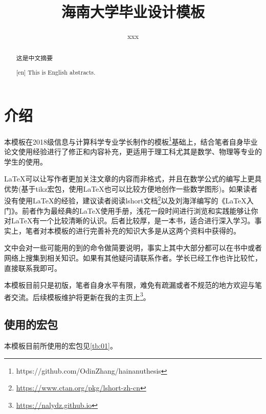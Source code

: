 \documentclass{hainanuthesis}
\title{海南大学毕业设计模板}
\author{xxx}
\theoremstyle{definition}
\begin{document}
	\makecover
	\begin{abstract}
		这是中文摘要
	\end{abstract}

	\thispagestyle{empty}
	
	\newpage
	\begin{abstract}[en]
		This is English abstracts.
	\end{abstract}
	\thispagestyle{empty}
	
	\newpage
	\tableofcontents
	\thispagestyle{empty}
	
	\newpage
	\setcounter{page}{1}
	\section{介绍}
	
	本模板在2018级信息与计算科学专业学长制作的模板\footnote{https://github.com/OdinZhang/hainanuthesis}基础上，结合笔者自身毕业论文使用经验进行了修正和内容补充，更适用于理工科尤其是数学、物理等专业的学生的使用。
	
	\LaTeX 可以让写作者更加关注文章的内容而非格式，并且在数学公式的编写上更具优势(基于tikz宏包，使用\LaTeX 也可以比较方便地创作一些数学图形)。如果读者没有使用\LaTeX 的经验，建议读者阅读lshort文档\footnote{\href{https://www.ctan.org/pkg/lshort-zh-cn}{https://www.ctan.org/pkg/lshort-zh-cn}}以及刘海洋\cite{liuhaiyang2013}编写的《\LaTeX 入门》。前者作为最经典的\LaTeX 使用手册，浅花一段时间进行浏览和实践能够让你对\LaTeX 有一个比较清晰的认识。后者比较厚，是一本书，适合进行深入学习。事实上，笔者对本模板的进行完善补充的知识大多是从这两个资料中获得的。
	
	文中会对一些可能用的到的命令做简要说明，事实上其中大部分都可以在书中或者网络上搜集到相关知识。如果有其他疑问请联系作者。学长已经工作也许比较忙，直接联系我即可。
	
	本模板目前只是初版，笔者自身水平有限，难免有疏漏或者不规范的地方欢迎与笔者交流。后续模板维护将更新在我的主页上\footnote{\href{https://nalydz.github.io/}{https://nalydz.github.io}}。
	
	\subsection{使用的宏包}

	本模板目前所使用的宏包见\cref{tb:01}。
	
\end{document}
